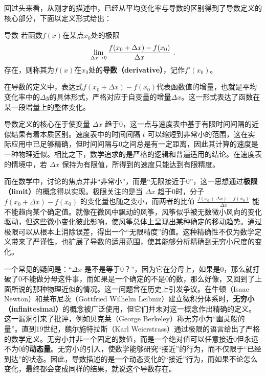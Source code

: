 回过头来看，从刚才的描述中，已经从平均变化率与导数的区别得到了导数定义的核心部分，下面以定义形式给出：

\begin{definition}{导数}
若函数$f(x)$在某点$x_0$处的极限
\begin{equation}
\lim_{\Delta x\to 0}{f(x_0+\Delta x)-f(x_0)\over \Delta x}~.
\end{equation}
存在，则称其为$f(x)$在$x_0$处的\textbf{导数（derivative）}，记作$f'(x_0)$。
\end{definition}

在导数的定义中，表达式$f(x_0+\Delta x)-f(x_0)$代表函数值的增量，也就是平均变化率中的$\Delta y$的具体形式，严格对应于自变量的增量$\Delta x$。这一形式表达了函数在某一段增量上的整体变化。

导数定义的核心在于使变量 $\Delta x$ 趋于0，这一点与速度表中基于有限时间间隔的近似结果有着本质区别。速度表中的时间间隔 $t$ 可以缩短到非常小的范围，这在实际应用中已足够精确，但时间间隔与0之间总是有一定距离，因此其计算的速度是一种物理近似。相比之下，数学追求的是严格的逻辑和普遍适用的结论。在速度表的情境中，若 $\Delta x$ 保持为有限值，所得到的速度只能达到有限精度。

而在数学中，讨论的焦点并非“非常小”，而是“无限接近于0”，这一思想通过\textbf{极限（limit）}的概念得以实现。极限关注的是当 $\Delta x$ 趋于0时，分子 $f(x_0 + \Delta x) - f(x_0)$ 的变化量也随之变小，而两者的比值 $\frac{f(x_0 + \Delta x) - f(x_0)}{\Delta x}$ 能不能趋向某个确定值。就像在微风中飘动的风筝，风筝似乎被无数微小风向的变化驱动，但这些微小变化彼此影响，使风筝总体上呈现出某种确定的移动趋势。通过极限可以从根本上消除误差，得出一个“无限精度”的值。这种精确性不仅为数学定义带来了严谨性，也扩展了导数的适用范围，使其能够分析精确到无穷小尺度的变化。

一个常见的疑问是：“$\Delta x$ 是不是等于0？”，因为它在分母上，如果是0，那么就打破了0不能做分母这件事，而如果是一个确定的不是0的数，那么好像，又回到了上面所说的那种物理近似的情况。这一问题曾在历史上引发争议。在牛顿（Isaac Newton）和莱布尼茨（Gottfried Wilhelm Leibniz）建立微积分体系时，\textbf{无穷小（infinitesimal）}的概念被广泛使用，但它们并未对这一概念作出精确的定义。这一漏洞引来了批评，例如贝克莱（George Berkeley）称无穷小为“幽灵般的量”。直到19世纪，魏尔施特拉斯（Karl Weierstrass）通过极限的语言给出了严格的数学定义。无穷小并非一个固定的数值，而是一个绝对值可以任意接近0但永远不为0的\textbf{动态量}。无穷小的引入，使数学能够研究“接近”的行为，而不仅限于“已经到达”的状态。因此，导数描述的是一个动态变化的“接近”行为，而如果不论怎么变化，最终都会变成同样的结果，就说这个导数存在。

